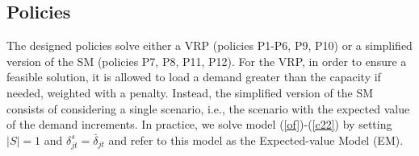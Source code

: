 \documentclass[authoryear,preprint,12pt]{elsarticle}
\begin{document}


\subsection{Policies}\label{sec: policies}
The designed policies solve either a VRP (policies P1-P6, P9, P10) or a simplified version of the SM (policies P7, P8, P11, P12). 
For the VRP, in order to ensure
a feasible solution, it is allowed to load a demand greater than the capacity if needed, weighted with a penalty. Instead, the simplified version of the SM consists of considering a single scenario, i.e., the scenario with the expected value of the demand increments. In practice, we solve model (\ref{of})-(\ref{c22}) by setting $|S|=1$ and
$\delta^s_{jt} = \bar\delta_{jt}$ and refer to this model as the Expected-value Model (EM). 
\end{document}
